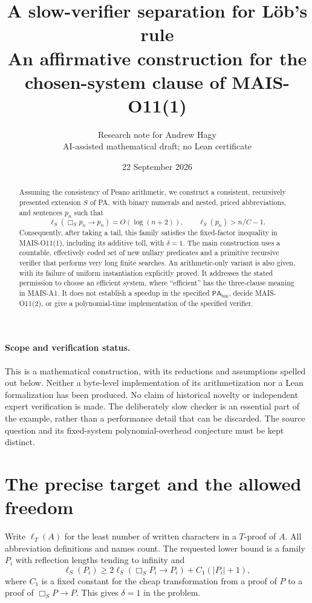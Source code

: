 \documentclass[11pt]{article}
\title{A slow-verifier separation for L\"ob's rule\\
\large An affirmative construction for the chosen-system clause of MAIS-O11(1)}
\author{Research note for Andrew Hagy\\\small AI-assisted mathematical draft; no Lean certificate}
\date{22 September 2026}
\theoremstyle{remark}
\newcommand{\PAbin}{\mathsf{PA}_{\mathrm{bin}}}
\begin{document}
\maketitle
\begin{abstract}
Assuming the consistency of Peano arithmetic, we construct a consistent,
recursively presented extension $S$ of PA, with binary numerals and nested,
priced abbreviations, and sentences $p_n$ such that
\[
 \ell_S(\Box_Sp_n\to p_n)=O(\log(n+2)),\qquad
 \ell_S(p_n)> n/C-1.
\]
Consequently, after taking a tail, this family satisfies the fixed-factor
inequality in MAIS-O11(1), including its additive toll, with $\delta=1$.
The main construction uses a countable, effectively coded set of new nullary
predicates and a primitive recursive verifier that performs very long finite
searches. An arithmetic-only variant is also given, with its failure of
uniform instantiation explicitly proved.
It addresses the stated permission to choose an efficient system, where
``efficient'' has the three-clause meaning in MAIS-A1. It does not establish
a speedup in the specified $\PAbin$, decide MAIS-O11(2), or give a
polynomial-time implementation of the specified verifier.
\end{abstract}

\paragraph{Scope and verification status.}
This is a mathematical construction, with its reductions and assumptions
spelled out below. Neither a byte-level implementation of its arithmetization
nor a Lean formalization has been produced. No claim of historical novelty or
independent expert verification is made. The deliberately slow checker is an
essential part of the example, rather than a performance detail that can be
discarded. The source question and its fixed-system polynomial-overhead
conjecture must be kept distinct.

\section{The precise target and the allowed freedom}

Write $\ell_T(A)$ for the least number of written characters in a $T$-proof
of $A$. All abbreviation definitions and names count. The requested lower
bound is a family $P_i$ with reflection lengths tending to infinity and
\begin{equation}\label{eq:target}
 \ell_S(P_i)\ge 2\ell_S(\Box_SP_i\to P_i)+C_1(|P_i|+1),
\end{equation}
where $C_1$ is a fixed constant for the cheap transformation from a proof of
$P$ to a proof of $\Box_SP\to P$. This gives $\delta=1$ in the problem.
\end{document}
